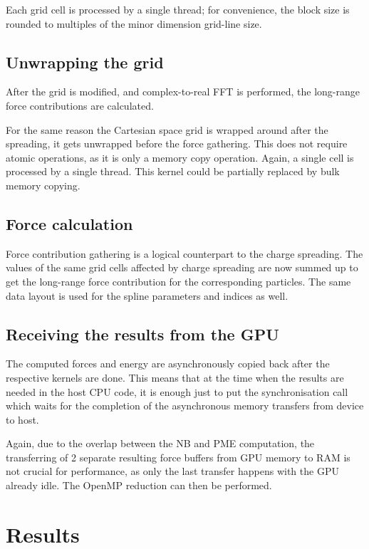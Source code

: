 \documentclass[12pt,a4paper]{report}
\newcommand{\draft}[1]{#1}
\begin{document}
Each grid cell is processed by a single thread; for convenience, the block size is rounded to multiples of the minor dimension grid-line size. 

\section{Unwrapping the grid}
After the grid is modified, and complex-to-real FFT is performed, the long-range force contributions are calculated.

For the same reason the Cartesian space grid is wrapped around after the spreading, it gets unwrapped before the force gathering. This does not require atomic operations, as it is only a memory copy operation. Again, a single cell is processed by a single thread. This kernel could be partially replaced by bulk memory copying. 

\section{Force calculation}
Force contribution gathering is a logical counterpart to the charge spreading. The values of the same grid cells affected by charge spreading are now summed up to get the long-range force contribution for the corresponding particles.
The same data layout is used for the spline parameters and indices as well.


\section{Receiving the results from the GPU}
The computed forces and energy are asynchronously copied back after the respective kernels are done. This means that at the time when the results are needed in the host CPU code, it is enough just to put the synchronisation call which waits for the completion of the asynchronous memory transfers from device to host.

Again, due to the overlap between the NB and PME computation, the transferring of 2 separate resulting force buffers from GPU memory to RAM is not crucial for performance, as only the last transfer happens with the GPU already idle. The OpenMP reduction can then be performed.

\newpage
\chapter{Results}
\end{document}
